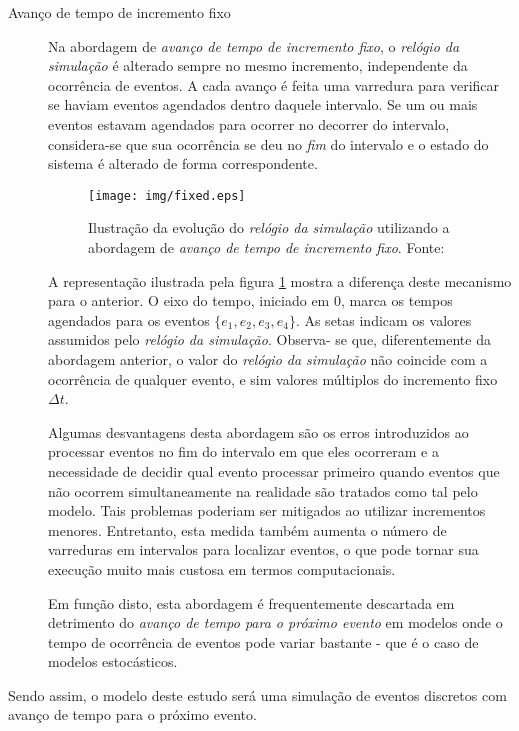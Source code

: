 \begin{description}
\item[Avanço de tempo de incremento fixo] \hfill

Na abordagem de \textit{avanço de tempo de incremento fixo}, o \textit{relógio
da simulação} é alterado sempre no mesmo incremento, independente da ocorrência
de eventos. A cada avanço é feita uma varredura para verificar se haviam eventos
agendados dentro daquele intervalo. Se um ou mais eventos estavam agendados para
ocorrer no decorrer do intervalo, considera-se que sua ocorrência se deu no
\textit{fim} do intervalo e o estado do sistema é alterado de forma
correspondente.

\begin{figure}[htb!]
\centering\texttt{[image: img/fixed.eps]}
\caption{\label{fig:fixedtime}Ilustração da evolução do \textit{relógio da simulação} utilizando a abordagem de \textit{avanço de tempo de incremento fixo}. Fonte:~\cite{Law}}
\end{figure}

A representação ilustrada pela figura \ref{fig:fixedtime} mostra a diferença
deste mecanismo para o anterior. O eixo do tempo, iniciado em 0, marca os tempos
agendados para os eventos $\{e_{1}, e_{2}, e_{3}, e_{4}\}$. As
setas indicam os valores assumidos pelo \textit{relógio da simulação}. Observa-
se que, diferentemente da abordagem anterior, o valor do \textit{relógio da
simulação} não coincide com a ocorrência de qualquer evento, e sim valores
múltiplos do incremento fixo $\Delta t$.

Algumas desvantagens desta abordagem são os erros introduzidos ao processar
eventos no fim do intervalo em que eles ocorreram e a necessidade de decidir
qual evento processar primeiro quando eventos que não ocorrem simultaneamente na
realidade são tratados como tal pelo modelo. Tais problemas poderiam ser
mitigados ao utilizar incrementos menores. Entretanto, esta medida também
aumenta o número de varreduras em intervalos para localizar eventos, o que pode
tornar sua execução muito mais custosa em termos computacionais.

Em função disto, esta abordagem é frequentemente descartada em detrimento do
\textit{avanço de tempo para o próximo evento} em modelos onde o tempo de
ocorrência de eventos pode variar bastante - que é o caso de modelos
estocásticos.

\end{description}

Sendo assim, o modelo deste estudo será uma simulação de eventos discretos com avanço de tempo para o próximo evento.

